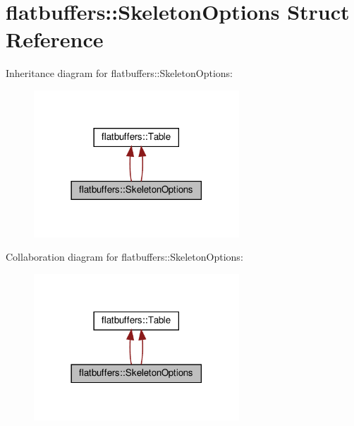 \hypertarget{structflatbuffers_1_1SkeletonOptions}{}\section{flatbuffers\+:\+:Skeleton\+Options Struct Reference}
\label{structflatbuffers_1_1SkeletonOptions}


Inheritance diagram for flatbuffers\+:\+:Skeleton\+Options\+:
\nopagebreak
\begin{figure}[H]
\begin{center}
\leavevmode
\includegraphics[width=218pt]{structflatbuffers_1_1SkeletonOptions__inherit__graph}
\end{center}
\end{figure}


Collaboration diagram for flatbuffers\+:\+:Skeleton\+Options\+:
\nopagebreak
\begin{figure}[H]
\begin{center}
\leavevmode
\includegraphics[width=218pt]{structflatbuffers_1_1SkeletonOptions__coll__graph}
\end{center}
\end{figure}
